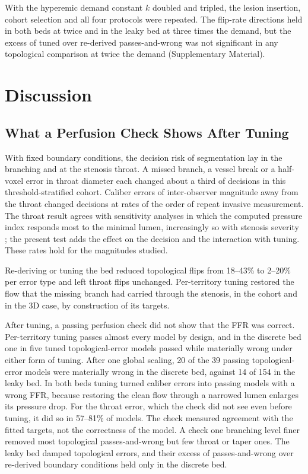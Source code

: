 \documentclass[journal,twoside,web]{ieeecolor}
\begin{document}
With the hyperemic demand constant $k$ doubled and tripled, the lesion insertion, cohort selection and all four protocols were repeated. The flip-rate directions held in both beds at twice and in the leaky bed at three times the demand, but the excess of tuned over re-derived passes-and-wrong was not significant in any topological comparison at twice the demand (Supplementary Material).

\section{Discussion}
\subsection{What a Perfusion Check Shows After Tuning}
With fixed boundary conditions, the decision risk of segmentation lay in the branching and at the stenosis throat. A missed branch, a vessel break or a half-voxel error in throat diameter each changed about a third of decisions in this threshold-stratified cohort. Caliber errors of inter-observer magnitude away from the throat changed decisions at rates of the order of repeat invasive measurement. The throat result agrees with sensitivity analyses
in which the computed pressure index responds most to the minimal lumen, increasingly so with stenosis severity
\cite{sankaran2015tmi,fernandez2024}; the present test adds the effect on the decision and the interaction with
tuning. These rates hold for the magnitudes studied.

Re-deriving or tuning the bed reduced topological flips from 18--43\% to 2--20\% per error type and left throat
flips unchanged. Per-territory
tuning restored the flow that the missing branch had carried through the stenosis, in the cohort and in the 3D case, by construction of its targets.

After tuning, a passing perfusion check did not show that the FFR was correct. Per-territory tuning passes
almost every model by design, and in the discrete bed one in five tuned topological-error models passed while
materially wrong under either form of tuning. After one global scaling, 20 of the 39 passing topological-error models were materially wrong in the discrete bed, against 14 of 154 in the leaky bed. In both beds tuning turned caliber errors into passing models with a wrong FFR, because restoring the clean flow through a narrowed lumen enlarges its pressure drop. For the throat error, which the check did not see even before tuning, it did so in 57--81\% of models. The check measured agreement with the fitted targets, not the correctness of the model. A check one
branching level finer removed most topological passes-and-wrong but few throat or taper ones. The leaky
bed damped topological errors, and their excess of passes-and-wrong over re-derived boundary conditions held only in
the discrete bed.
\end{document}
